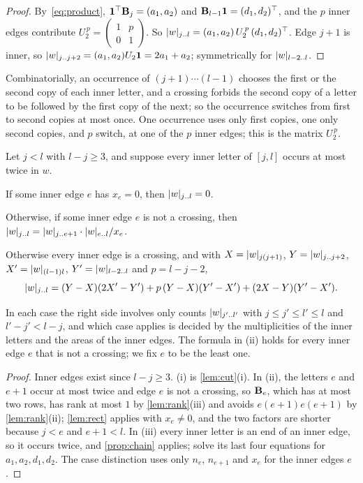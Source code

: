 \documentclass[11pt,a4paper]{article}
\newcommand{\Umat}{U}
\begin{document}
\begin{proof}
By~\eqref{eq:product}, $\mathbf{1}^{\top}\mathbf{B}_{j}=(a_1,a_2)$ and $\mathbf{B}_{l-1}\mathbf{1}=(d_1,d_2)^{\top}$, and the $p$ inner edges contribute $\Umat_2^{\,p}=\left(\begin{smallmatrix}1&p\\0&1\end{smallmatrix}\right)$. So $\cntr{j}{l}=(a_1,a_2)\,\Umat_2^{\,p}\,(d_1,d_2)^{\top}$. Edge $j+1$ is inner, so $\cntr{j}{j+2}=(a_1,a_2)\Umat_2\one=2a_1+a_2$; symmetrically for $\lvert w\rvert_{l-2\mathinner{\ldotp\ldotp} l}$.
\end{proof}

Combinatorially, an occurrence of $(j+1)\cdots(l-1)$ chooses the first or the second copy of each inner letter, and a crossing forbids the second copy of a letter to be followed by the first copy of the next; so the occurrence switches from first to second copies at most once. One occurrence uses only first copies, one only second copies, and $p$ switch, at one of the $p$ inner edges; this is the matrix $\Umat_2^{\,p}$.

\begin{theorem}\label{thm:main}
Let $j<l$ with $l-j\ge3$, and suppose every inner letter of $[j,l]$ occurs at most twice in $w$.
\begin{parts}
\item If some inner edge $e$ has $x_e=0$, then $\lvert w\rvert_{j\mathinner{\ldotp\ldotp} l}=0$.
\item Otherwise, if some inner edge $e$ is not a crossing, then $\lvert w\rvert_{j\mathinner{\ldotp\ldotp} l}=\lvert w\rvert_{j\mathinner{\ldotp\ldotp} e+1}\cdot\lvert w\rvert_{e\mathinner{\ldotp\ldotp} l}/x_e$.
\item Otherwise every inner edge is a crossing, and with $X=\lvert w\rvert_{j(j+1)}$, $Y=\lvert w\rvert_{j\mathinner{\ldotp\ldotp} j+2}$, $X'=\lvert w\rvert_{(l-1)l}$, $Y'=\lvert w\rvert_{l-2\mathinner{\ldotp\ldotp} l}$ and $p=l-j-2$,
\[
\lvert w\rvert_{j\mathinner{\ldotp\ldotp} l}=(Y-X)(2X'-Y')+p\,(Y-X)(Y'-X')+(2X-Y)(Y'-X').
\]
\end{parts}
In each case the right side involves only counts $\lvert w\rvert_{j'\mathinner{\ldotp\ldotp} l'}$ with $j\le j'\le l'\le l$ and $l'-j'<l-j$, and which case applies is decided by the multiplicities of the inner letters and the areas of the inner edges. The formula in (ii) holds for every inner edge $e$ that is not a crossing; we fix $e$ to be the least one.
\end{theorem}

\begin{proof}
Inner edges exist since $l-j\ge3$. (i) is \cref{lem:cut}(i). In (ii), the letters $e$ and $e+1$ occur at most twice and edge $e$ is not a crossing, so $\mathbf{B}_{e}$, which has at most two rows, has rank at most $1$ by \cref{lem:rank}(iii) and avoids $e(e+1)e(e+1)$ by \cref{lem:rank}(ii); \cref{lem:rect} applies with $x_e\ne0$, and the two factors are shorter because $j<e$ and $e+1<l$. In (iii) every inner letter is an end of an inner edge, so it occurs twice, and \cref{prop:chain} applies; solve its last four equations for $a_1,a_2,d_1,d_2$. The case distinction uses only $n_e$, $n_{e+1}$ and $x_e$ for the inner edges $e$.
\end{proof}
\end{document}
